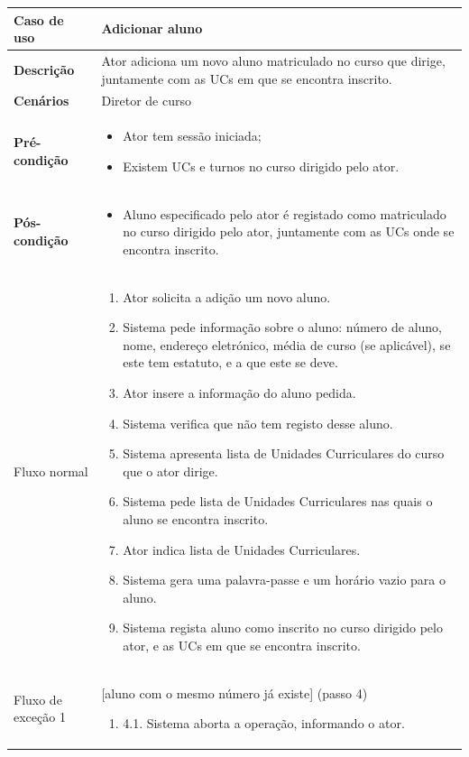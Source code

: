 \documentclass[12pt, a4paper]{article}
\newenvironment{condition}{
    \begin{itemize}[wide=0pt]
        \vspace{-0.2cm}
}{
        \vspace{-0.5cm}
    \end{itemize}
}
\newcommand\flow[1]{
    Fluxo normal &
    \singlespacing
    \begin{enumerate}[wide=0pt]
        #1
        \vspace{-0.3cm}
    \end{enumerate} \\ \hline
}
\newcommand\otherflow[3]{
    #1 &
    #2
    \singlespacing
    \begin{enumerate}[wide=0pt]
        #3
        \vspace{-0.3cm}
    \end{enumerate} \\ \hline
}
\newenvironment{usecase}[5]{
    \begin{table}[H]
        \centering
        \begin{tabular}{|>{\centering\arraybackslash\bf}m{3cm}|m{13cm}|}
            \hline
            Caso de uso & \textbf{#1} \\

            \hline
            Descrição & #2 \\

            \hline
            Cenários & #3 \\

            \hline
            Pré-condição &
            \begin{condition}
                #4
            \end{condition} \\

            \hline
            Pós-condição &
            \begin{condition}
                #5
            \end{condition} \\

            \hline
}{
    \end{tabular}
\end{table}
}
\begin{document}
\begin{usecase}
    {Adicionar aluno}
    {Ator adiciona um novo aluno matriculado no curso que dirige, juntamente com as UCs em que se
        encontra inscrito.}
    {Diretor de curso}
    {
        \item Ator tem sessão iniciada;
        \item Existem UCs e turnos no curso dirigido pelo ator.
    }
    {
        \item Aluno especificado pelo ator é registado como matriculado no curso dirigido pelo ator,
        juntamente com as UCs onde se encontra inscrito.
    }

    \flow{
        \item Ator solicita a adição um novo aluno.
        \item Sistema pede informação sobre o aluno: número de aluno, nome, endereço eletrónico,
            média de curso (se aplicável), se este tem estatuto, e a que este se deve.
        \item Ator insere a informação do aluno pedida.
        \item Sistema verifica que não tem registo desse aluno.
        \item Sistema apresenta lista de Unidades Curriculares do curso que o ator dirige.
        \item Sistema pede lista de Unidades Curriculares nas quais o aluno se encontra inscrito.
        \item Ator indica lista de Unidades Curriculares.
        \item Sistema gera uma palavra-passe e um horário vazio para o aluno.
        \item Sistema regista aluno como inscrito no curso dirigido pelo ator, e as UCs em que se
            encontra inscrito.
    }

    \otherflow{Fluxo de exceção 1}
        {[aluno com o mesmo número já existe] (passo 4)}{

        \item[4.1.] Sistema aborta a operação, informando o ator.
    }
\end{usecase}
\end{document}

